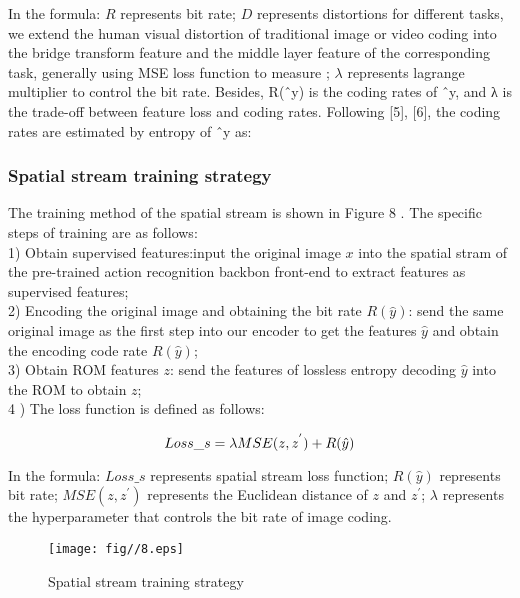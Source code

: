 \documentclass[a4paper]{cas-sc}
\begin{document}
In the formula: $R$ represents bit rate; 
$D$ represents distortions for different tasks, 
we extend the human visual distortion of traditional image or video coding into the bridge transform feature 
and the middle layer feature of the corresponding task, 
generally using MSE loss function to measure ; 
$\lambda$ represents lagrange multiplier to control the bit rate.
Besides, R(ˆy) is the coding rates of ˆy, and λ is the
trade-off between feature loss and coding rates. Following [5],
[6], the coding rates are estimated by entropy of ˆy as:\\

\subsubsection{Spatial stream training strategy}
The training method of the spatial stream is shown in Figure 8 . 
The specific steps of training are as follows:\\
1) Obtain supervised features:input the original image $x$ into the spatial stram of the 
pre-trained action recognition backbon front-end to extract features as supervised features;\\
2) Encoding the original image and obtaining the bit rate $R(\hat{y})$: 
send the same original image as the first step into our encoder to get the features $\hat{y}$ 
and obtain the encoding code rate $R(\hat{y})$;\\
3) Obtain ROM features $z$: 
send the features of lossless entropy decoding $\hat{y}$ into the ROM to obtain $z$;\\
4 ) The loss function is defined as follows:

\begin{equation}
  \centering
    Loss\_s=\lambda{MSE}(z,z^{'})+R(\hat{y})
\end{equation}

In the formula: $Loss\_s$  represents spatial stream loss function; 
$R(\hat{y})$ represents bit rate; $MSE(z,z^{'})$ represents the Euclidean distance of $z$ and $z^{'}$; 
$\lambda$ represents the hyperparameter that controls the bit rate of image coding.\\

\begin{figure}[ht]
	\centering
		\texttt{[image: fig//8.eps]}
	  \caption{Spatial stream training strategy}\label{fig.8}
\end{figure}
\end{document}
